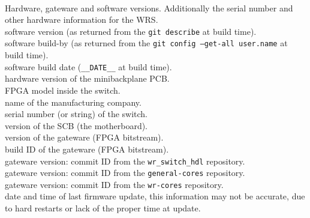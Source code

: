    {\\
    Hardware, gateware and software versions. Additionally the serial number and
    other hardware information for the WRS.}
   {\\
    software version (as returned from the \texttt{git describe} at build
    time).}
   {\\
    software build-by (as returned from the \texttt{git config --get-all
    user.name} at build time).}
   {\\
    software build date (\texttt{\_\_DATE\_\_} at build time).}
   {\\
    hardware version of the minibackplane PCB.}
   {\\
    FPGA model inside the switch.}
   {\\
    name of the manufacturing company.}
   {\\
    serial number (or string) of the switch.}
   {\\
    version of the SCB (the motherboard).}
   {\\
    version of the gateware (FPGA bitstream).}
   {\\
    build ID of the gateware (FPGA bitstream).}
   {\\
    gateware version: commit ID from the \texttt{wr\_switch\_hdl} repository.}
   {\\
    gateware version: commit ID from the \texttt{general-cores} repository.}
   {\\
    gateware version: commit ID from the \texttt{wr-cores} repository.}
   {\\
    date and time of last firmware update, this information may not be accurate,
    due to hard restarts or lack of the proper time at update.}


